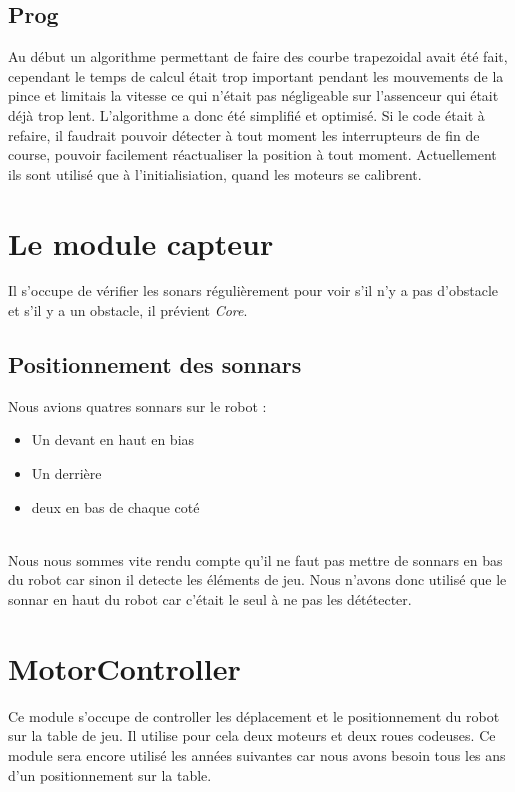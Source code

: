 \subsection{Prog}
Au début un algorithme permettant de faire des courbe trapezoidal avait été fait, cependant le temps de calcul était trop important pendant les mouvements de la pince et limitais la vitesse ce qui n'était pas négligeable sur l'assenceur qui était déjà trop lent. L'algorithme a donc été simplifié et optimisé. Si le code était à refaire, il faudrait pouvoir détecter à tout moment les interrupteurs de fin de course, pouvoir facilement réactualiser la position à tout moment. Actuellement ils sont utilisé que à l'initialisiation, quand les moteurs se calibrent.

\section{Le module capteur}
Il s'occupe de vérifier les sonars régulièrement pour voir s'il n'y a pas d'obstacle et s'il y a un obstacle, il prévient \textit{Core}.

\subsection{Positionnement des sonnars}
Nous avions quatres sonnars sur le robot :\\

\begin{itemize}
	\item Un devant en haut en bias
	\item Un derrière
	\item deux en bas de chaque coté
\end{itemize}\ \\

Nous nous sommes vite rendu compte qu'il ne faut pas mettre de sonnars en bas du robot car sinon il detecte les éléments de jeu. Nous n'avons donc utilisé que le sonnar en haut du robot car c'était le seul à ne pas les dététecter.


\section{MotorController} 
Ce module s'occupe de controller les déplacement et le positionnement du robot sur la table de jeu. Il utilise pour cela deux moteurs et deux roues codeuses. Ce module sera encore utilisé les années suivantes car nous avons besoin tous les ans d'un positionnement sur la table.

